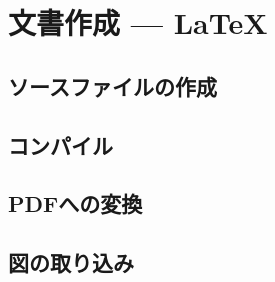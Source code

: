 \documentclass[main]{subfiles}
\begin{document}
\chapter{文書作成  --- \LaTeX}
\section{ソースファイルの作成}
\section{コンパイル}
\section{PDFへの変換}
\section{図の取り込み}
\end{document}
